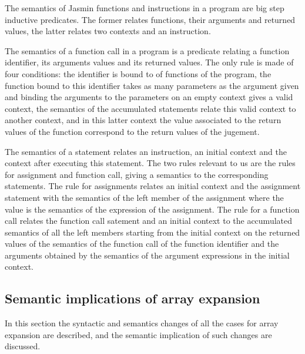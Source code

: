 \documentclass{article}
\begin{document}
The semantics of Jasmin functions and instructions in a program are big step
inductive predicates. The former relates functions, their arguments and returned
values, the latter relates two contexts and an instruction.

The semantics of a function call in a program is a predicate relating a function
identifier, its arguments values and its returned values. The only rule is made
of four conditions: the identifier is bound to of functions of the program, the
function bound to this identifier takes as many parameters as the argument given
and binding the arguments to the parameters on an empty context gives a valid
context, the semantics of the accumulated statements relate this valid context
to another context, and in this latter context the value associated to the
return values of the function correspond to the return values of the jugement.

\smallskip

The semantics of a statement relates an instruction, an initial context and the
context after executing this statement. The two rules relevant to us are the
rules for assignment and function call, giving a semantics to the corresponding
statements. The rule for assignments relates an initial context and the assignment
statement with the semantics of the left member of the assignment where the
value is the semantics of the expression of the assignment. The rule for a
function call relates the function call satement and an initial context to the
accumulated semantics of all the left members starting from the initial context
on the returned values of the semantics of the function call of the function
identifier and the arguments obtained by the semantics of the argument
expressions in the initial context.


\subsection{Semantic implications of array expansion}

In this section the syntactic and semantics changes of all the cases for array
expansion are described, and the semantic implication of such changes are
discussed.
\end{document}
